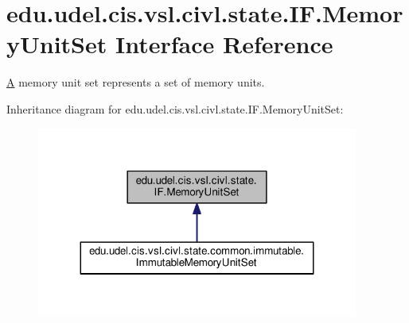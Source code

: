 \hypertarget{interfaceedu_1_1udel_1_1cis_1_1vsl_1_1civl_1_1state_1_1IF_1_1MemoryUnitSet}{}\section{edu.\+udel.\+cis.\+vsl.\+civl.\+state.\+I\+F.\+Memory\+Unit\+Set Interface Reference}
\label{interfaceedu_1_1udel_1_1cis_1_1vsl_1_1civl_1_1state_1_1IF_1_1MemoryUnitSet}


\hyperlink{structA}{A} memory unit set represents a set of memory units.  




Inheritance diagram for edu.\+udel.\+cis.\+vsl.\+civl.\+state.\+I\+F.\+Memory\+Unit\+Set\+:
\nopagebreak
\begin{figure}[H]
\begin{center}
\leavevmode
\includegraphics[width=299pt]{interfaceedu_1_1udel_1_1cis_1_1vsl_1_1civl_1_1state_1_1IF_1_1MemoryUnitSet__inherit__graph}
\end{center}
\end{figure}
